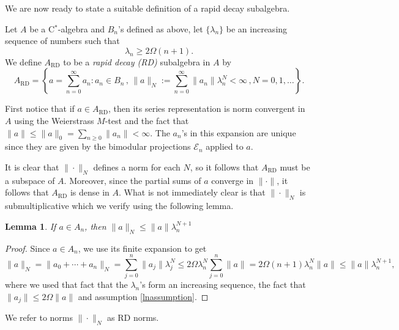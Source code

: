 \documentclass[12pt,reqno]{amsart}
\numberwithin{equation}{section}
\newtheorem{lem}[theo]{{\sc \bf Lemma}}
\newenvironment{defin}{\medskip\noindent{\bf Definition:\/} }{\medskip}
\begin{document}
We are now ready to state a suitable definition of a rapid decay subalgebra.

\begin{defin}
Let $A$ be a C$^*$-algebra and $B_n$'s defined as above, let $\{\lambda_n\}$ be an increasing sequence of numbers such that
\begin{equation}\label{lnassumption}
\lambda_n\geq2\Omega(n+1).
\end{equation}
We define $A_\textrm{RD}$ to be a {\it rapid decay (RD)} subalgebra in $A$ by
\begin{equation*}
A_\textrm{RD} = \left\{a=\sum_{n=0}^\infty a_n: a_n\in B_n\,,\,\|a\|_N := \sum_{n=0}^\infty\|a_n\|\lambda_n^N<\infty\,,N=0,1,\ldots\right\}.
\end{equation*}
\end{defin}

First notice that if $a\in A_\textrm{RD}$, then its series representation is norm convergent in $A$ using the Weierstrass $M$-test and the fact that $\|a\|\leq\|a\|_0=\sum_{n\ge0}\|a_n\|<\infty$.  
The $a_n$'s in this expansion are unique since they are given by the bimodular projections $\mathcal{E}_n$ applied to $a$. 

It is clear that $\|\cdot\|_N$ defines a norm for each $N$, so it follows that $A_\textrm{RD}$ must be a subspace of $A$.  Moreover, since the partial sums of $a$ converge in $\|\cdot\|$, it follows that $A_\textrm{RD}$ is dense in $A$.  
What is not immediately clear is that $\|\cdot\|_N$ is submultiplicative which we verify using the following lemma.

\begin{lem}\label{Nnorm_est_in_A_n}
If $a\in A_n$, then $\|a\|_N\le  \|a\|\lambda_n^{N+1}$
\end{lem}
\begin{proof}
Since $a\in A_n$, we use its finite expansion to get
\begin{equation*}
\|a\|_N=\|a_0+\cdots+a_n\|_N = \sum_{j=0}^n\|a_j\|\lambda_j^N\le 2\Omega \lambda_n^N\sum_{j=0}^n\|a\| = 2\Omega (n+1)\lambda_n^N\|a\|\le  \|a\|\lambda_n^{N+1},
\end{equation*}
where we used that fact that the $\lambda_n$'s form an increasing sequence, the fact that $\|a_j\|\le 2\Omega\|a\|$ and assumption \eqref{lnassumption}.
\end{proof}

We refer to norms $\|\cdot\|_N$ as RD norms.
\end{document}
